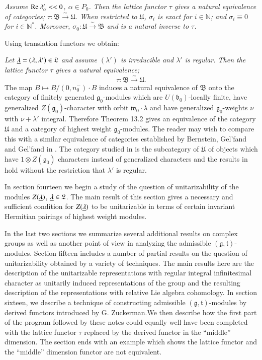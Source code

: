 \medskip
{}
\textit{
Assume $\operatorname{Re} \lambda'_\alpha << 0$, $\alpha \in P_0$. Then the lattice
functor $\tau$ gives a natural equivalence of categories; $\tau :
\mathfrak{B} \xrightarrow{\sim} \mathfrak{U}$. When restricted to
$\mathfrak{U}$, $\sigma_i$ is exact for $i \in \mathbb{N}$; and
$\sigma_i \equiv  0$ for $i \in \mathbb{N}^*$. Moreover, $\sigma_0 :
\mathfrak{U} \xrightarrow{\sim} \mathfrak{B}$ and is a natural inverse
to $\tau$.}


Using translation functors we obtain:

\medskip
{}
\textit{Let $\underline{\lambda} = (\lambda, \lambda') \in \mathfrak{L}$ and
  assume $(\lambda')$ is irreducible and $\lambda'$ is regular. Then
  the lattice functor $\tau$ gives a natural equivalence;}
$$
\tau : \mathfrak{B} \xrightarrow{\sim} \mathfrak{U} .
$$\pageoriginale
The map $B \mapsto B/(0, n^-_0) \cdot B$ induces a natural equivalence
of $\mathfrak{B}$ onto the category of finitely generated
$\mathfrak{g}_0$-modules which are $U(\mathfrak{b}_0)$-locally finite,
have generalized $Z(\mathfrak{g}_0)$-character with orbit
$\mathfrak{w}_0 \cdot \lambda$ and have generalized
$\mathfrak{g}_0$-weights $\nu$ with $\nu + \lambda'$
integral. Therefore Theorem 13.2 gives an equivalence of the category
$\mathfrak{U}$ and a category of highest weight
$\mathfrak{g}_0$-modules. The reader may wish to compare this with a
similar equivalence of categories established by Bernstein, Gel'fand
and Gel'fand in \cite{key3}. The category studied in \cite{key3} is
the subcategory of $\mathfrak{U}$ of objects which have $1 \otimes
Z(\mathfrak{g}_0)$ characters instead of generalized characters and
the results in \cite{key3} hold without the restriction that
$\lambda'$ is regular.

In section fourteen we begin a study of the question of
unitarizability of the modules $Z(\underline{\lambda})$, $\underline{\lambda} \in
\mathfrak{L}$. The main result of this section gives a necessary and
sufficient condition for $Z(\underline{\lambda})$ to be unitarizable in terms
of certain invariant Hermitian pairings of highest weight modules. 

In the last two sections we summarize several additional results on
complex groups as well as another point of view in analyzing the
admissible $(\mathfrak{g}, \mathfrak{t})$-modules. Section fifteen
includes a number of partial results on the question of
unitarizability obtained by a variety of techniques. The main results
here are the description of the unitarizable representations with
regular integral infinitesimal character as unitarily induced
representations of the group and the resulting description of the
representations with relative Lie algebra cohomology. In section
sixteen, we describe a technique of constructing admissible
$(\mathfrak{g}, \mathfrak{t})$-modules by derived functors introduced
by G. Zuckerman.\pageoriginale We then describe how the first part of
the program followed by these notes could equally well have been
completed with the lattice functor $\tau$ replaced by the derived
functor in the ``middle'' dimension. The section ends with an example
which shows the lattice functor and the ``middle'' dimension functor
are not equivalent.

